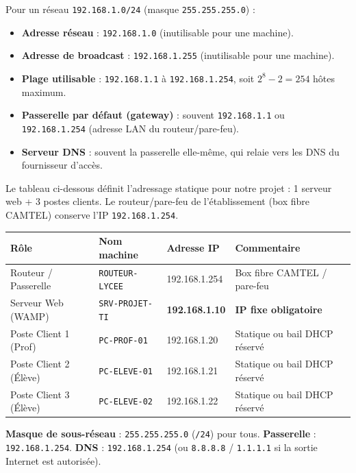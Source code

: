 \documentclass[11pt]{article}
\begin{document}
\begin{propriete}
Pour un réseau \texttt{192.168.1.0/24} (masque \texttt{255.255.255.0}) :
\begin{itemize}
    \item \textbf{Adresse réseau} : \texttt{192.168.1.0} (inutilisable pour une machine).
    \item \textbf{Adresse de broadcast} : \texttt{192.168.1.255} (inutilisable pour une machine).
    \item \textbf{Plage utilisable} : \texttt{192.168.1.1} à \texttt{192.168.1.254}, soit $2^{8}-2 = 254$ hôtes maximum.
    \item \textbf{Passerelle par défaut (gateway)} : souvent \texttt{192.168.1.1} ou \texttt{192.168.1.254} (adresse LAN du routeur/pare-feu).
    \item \textbf{Serveur DNS} : souvent la passerelle elle-même, qui relaie vers les DNS du fournisseur d'accès.
\end{itemize}
\end{propriete}

\begin{exemplebox}
Le tableau ci-dessous définit l'adressage statique pour notre projet : 1 serveur web + 3 postes clients. Le routeur/pare-feu de l'établissement (box fibre CAMTEL) conserve l'IP \texttt{192.168.1.254}.

\begin{center}
\begin{tabularx}{\linewidth}{|l|X|l|X|}\hline
\rowcolor{popblueL}
\textbf{Rôle} & \textbf{Nom machine} & \textbf{Adresse IP} & \textbf{Commentaire} \\\hline
Routeur / Passerelle & \texttt{ROUTEUR-LYCEE} & 192.168.1.254 & Box fibre CAMTEL / pare-feu \\\hline
Serveur Web (WAMP) & \texttt{SRV-PROJET-TI} & \textbf{192.168.1.10} & \textbf{IP fixe obligatoire} \\\hline
Poste Client 1 (Prof) & \texttt{PC-PROF-01} & 192.168.1.20 & Statique ou bail DHCP réservé \\\hline
Poste Client 2 (Élève) & \texttt{PC-ELEVE-01} & 192.168.1.21 & Statique ou bail DHCP réservé \\\hline
Poste Client 3 (Élève) & \texttt{PC-ELEVE-02} & 192.168.1.22 & Statique ou bail DHCP réservé \\\hline
\end{tabularx}
\end{center}
\textbf{Masque de sous-réseau} : \texttt{255.255.255.0} (\texttt{/24}) pour tous. \textbf{Passerelle} : \texttt{192.168.1.254}. \textbf{DNS} : \texttt{192.168.1.254} (ou \texttt{8.8.8.8} / \texttt{1.1.1.1} si la sortie Internet est autorisée).
\end{exemplebox}
\end{document}
